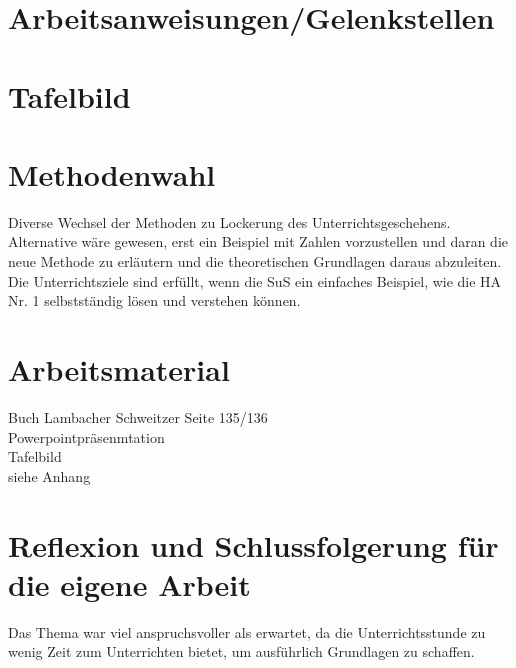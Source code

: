 \documentclass[11pt]{scrartcl}
\begin{document}
\section{Arbeitsanweisungen/Gelenkstellen}


\section{Tafelbild}


\section{Methodenwahl}
Diverse Wechsel der Methoden zu Lockerung des Unterrichtsgeschehens. Alternative wäre gewesen, erst ein Beispiel mit Zahlen vorzustellen und daran die neue Methode zu erläutern und die theoretischen Grundlagen daraus abzuleiten.
Die Unterrichtsziele sind erfüllt, wenn die SuS ein einfaches Beispiel, wie die HA Nr. 1 selbstständig lösen und verstehen können.


\section{Arbeitsmaterial}
Buch Lambacher Schweitzer Seite 135/136\\
Powerpointpräsenmtation\\
Tafelbild\\
siehe Anhang


\section{Reflexion und Schlussfolgerung für die eigene Arbeit}
Das Thema war viel anspruchsvoller als erwartet, da die Unterrichtsstunde zu wenig Zeit zum Unterrichten bietet, um ausführlich Grundlagen zu schaffen.
\end{document}
